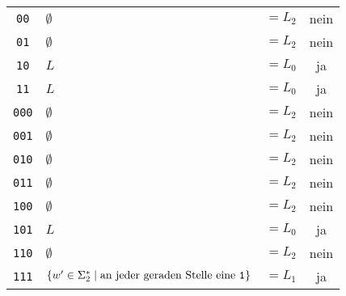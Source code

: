 \begin{loesung}
\begin{teilaufgaben}
\begin{center}
\begin{tabular}{c|ll|c}
 {\tt 00}&$\emptyset$&$=L_2$&nein\\
 {\tt 01}&$\emptyset$&$=L_2$&nein\\
 {\tt 10}&$L$&$=L_0$&ja\\
 {\tt 11}&$L$&$=L_0$&ja\\
{\tt 000}&$\emptyset$&$=L_2$&nein\\
{\tt 001}&$\emptyset$&$=L_2$&nein\\
{\tt 010}&$\emptyset$&$=L_2$&nein\\
{\tt 011}&$\emptyset$&$=L_2$&nein\\
{\tt 100}&$\emptyset$&$=L_2$&nein\\
{\tt 101}&$L$&$=L_0$&ja\\
{\tt 110}&$\emptyset$&$=L_2$&nein\\
{\tt 111}&$\{ w'\in\Sigma_2^*\;|\; \text{an jeder geraden Stelle eine {\tt 1}}\}$&$=L_1$&ja\\
\hline
\end{tabular}
\end{center}


\end{teilaufgaben}
\end{loesung}
